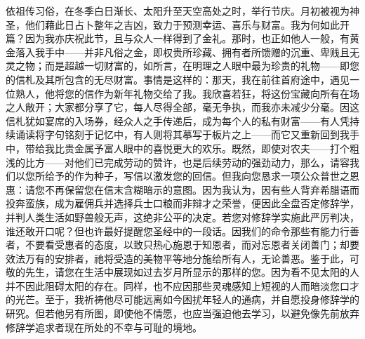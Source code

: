 \par

\par

依祖传习俗，在冬季白日渐长、太阳升至天空高处之时，举行节庆。月初被视为神圣，他们藉此日占卜整年之吉凶，致力于预测幸运、喜乐与财富。我为何如此开篇？因为我亦庆祝此节，且与众人一样得到了金礼。那时，也正如他人一般，有黄金落入我手中——并非凡俗之金，即权贵所珍藏、拥有者所馈赠的沉重、卑贱且无灵之物；而是超越一切财富的，如所言，在明理之人眼中最为珍贵的礼物——即您的信札及其所包含的无尽财富。事情是这样的：那天，我在前往首府途中，遇见一位熟人，他将您的信作为新年礼物交给了我。我欣喜若狂，将这份宝藏向所有在场之人敞开；大家都分享了它，每人尽得全部，毫无争执，而我亦未减少分毫。因这信札犹如宴席的入场券，经众人之手传递后，成为每个人的私有财富——有人凭持续诵读将字句铭刻于记忆中，有人则将其摹写于板片之上——而它又重新回到我手中，带给我比贵金属予富人眼中的喜悦更大的欢乐。既然，即使对农夫——打个粗浅的比方——对他们已完成劳动的赞许，也是后续劳动的强劲动力，那么，请容我们以您所给予的作为种子，写信以激发您的回信。但我向您恳求一项公众普世之恩惠：请您不再保留您在信末含糊暗示的意图。因为我认为，因有些人背弃希腊语而投奔蛮族，成为雇佣兵并选择兵士口粮而非辩才之荣誉，便因此全盘否定修辞学，并判人类生活如野兽般无声，这绝非公平的决定。若您对修辞学实施此严厉判决，谁还敢开口呢？但也许最好提醒您圣经中的一段话。因我们的命令那些有能力行善者，不要看受惠者的态度，以致只热心施恩于知恩者，而对忘恩者关闭善门；却要效法万有的安排者，祂将受造的美物平等地分施给所有人，无论善恶。鉴于此，可敬的先生，请您在生活中展现如过去岁月所显示的那样的您。因为看不见太阳的人并不因此阻碍太阳的存在。同样，也不应因那些灵魂感知上短视的人而暗淡您口才的光芒。至于，我祈祷他尽可能远离如今困扰年轻人的通病，并自愿投身修辞学的研究。但若他另有所图，即使他不情愿，也应当强迫他去学习，以避免像先前放弃修辞学追求者现在所处的不幸与可耻的境地。\par



\section{}

